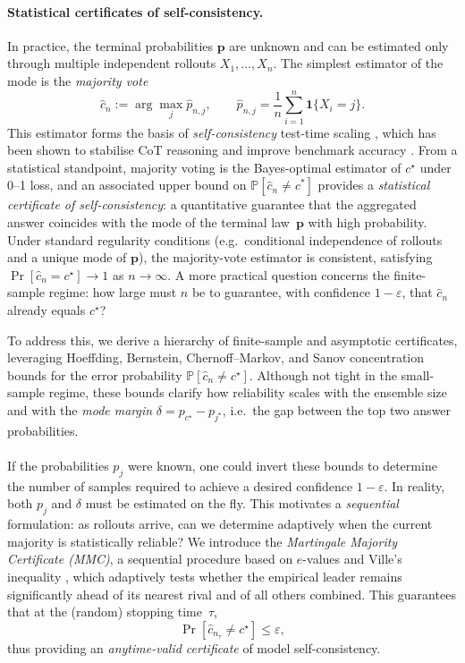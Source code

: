 \documentclass{article} %
\begin{document}
\paragraph{Statistical certificates of self-consistency.}
In practice, the terminal probabilities $\mathbf p$ are unknown and can be estimated only through multiple independent rollouts $X_1,\ldots,X_n$. 
The simplest estimator of the mode is the \emph{majority vote}
\[
\widehat{c}_n := \arg\max_j \hat p_{n,j}, 
\qquad
\hat p_{n,j} = \frac{1}{n}\sum_{i=1}^{n}\mathbf{1}\{X_i=j\}.
\]
This estimator forms the basis of \emph{self-consistency} test-time scaling \citep{wang2022selfconsistency,madaan2023selfrefine}, which has been shown to stabilise CoT reasoning and improve benchmark accuracy \citep{anil2023palm,zuo2025ttrl}.  
From a statistical standpoint, majority voting is the Bayes-optimal estimator of $c^\star$ under 0--1 loss, and an associated upper bound on $\mathbb{P}[\widehat{c}_n \neq c^*]$ provides a \emph{statistical certificate of self-consistency}: a quantitative guarantee that the aggregated answer coincides with the mode of the terminal law~$\mathbf p$ with high probability. 
Under standard regularity conditions (e.g.\ conditional independence of rollouts and a unique mode of $\mathbf p$), the majority-vote estimator is consistent, satisfying $\Pr[\widehat{c}_n = c^\star] \to 1$ as $n \to \infty$.  
A more practical question concerns the finite-sample regime: how large must $n$ be to guarantee, with confidence $1-\varepsilon$, that $\widehat{c}_n$ already equals $c^\star$?


To address this, we derive a hierarchy of finite-sample and asymptotic certificates, leveraging Hoeffding, Bernstein, Chernoff--Markov, and Sanov concentration bounds for the error probability $\mathbb{P}[\widehat{c}_n \neq c^\star]$. 
Although not tight in the small-sample regime, these bounds clarify how reliability scales with the ensemble size and with the \emph{mode margin} $\delta = p_{c^\star} - p_{j^\star}$, i.e.\ the gap between the top two answer probabilities.
\\\\
If the probabilities $p_j$ were known, one could invert these bounds to determine the number of samples required to achieve a desired confidence $1-\varepsilon$. 
In reality, both $p_j$ and $\delta$ must be estimated on the fly. 
This motivates a \emph{sequential} formulation: as rollouts arrive, can we determine adaptively when the current majority is statistically reliable? 
We introduce the \emph{Martingale Majority Certificate (MMC)}, a sequential procedure based on $e$-values and Ville’s inequality \citep{ville1939collectif,howard2021confidenceseq}, which adaptively tests whether the empirical leader remains significantly ahead of its nearest rival and of all others combined. This guarantees that at the (random) stopping time~$\tau$,
\[
\Pr[\widehat{c}_{n_\tau} \neq c^\star] \le \varepsilon,
\]
thus providing an \emph{anytime-valid certificate} of model self-consistency.
\end{document}
